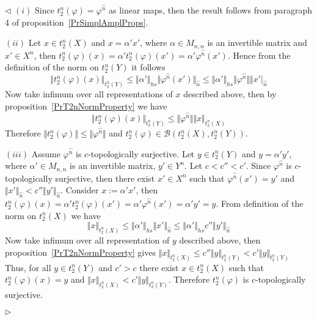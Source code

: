 \documentclass[12pt]{article}
\newenvironment{proof}{\par $\triangleleft$}{$\triangleright$}
\begin{document}
\begin{proof}
$(i)$ Since $t_2^n(\varphi)=\varphi^{\wideparen{n}}$ as linear maps, then the 
result follows from paragraph 4 of proposition~\ref{PrSimplAmplProps}. 

$(ii)$ Let $x\in t_2^n(X)$ and $x=\alpha'x'$, where $\alpha\in M_{n,n}$ is an 
invertible matrix and $x'\in X^{n}$, then 
$t_2^n(\varphi)(x)=\alpha't_2^n(\varphi)(x')
=\alpha'\varphi^{\wideparen{n}}(x')$. Hence from the definition of the norm 
on $t_2^n(Y)$ it follows
$$
\Vert t_2^n(\varphi)(x)\Vert_{t_2^n(Y)}
\leq\Vert\alpha'\Vert_{hs}\Vert\varphi^{\wideparen{n}}(x')\Vert_{\wideparen{n}}
\leq\Vert\alpha'\Vert_{hs}\Vert\varphi^{\wideparen{n}}\Vert\Vert
x'\vert_{\wideparen{n}}
$$
Now take infimum over all representations of $x$ described above, then by 
proposition~\ref{PrT2nNormProperty} we have
$$
\Vert
t_2^n(\varphi)(x)\Vert_{t_2^n(Y)}\leq\Vert\varphi^{\wideparen{n}}\Vert\Vert
x\Vert_{t_2^n(X)}
$$
Therefore $\Vert t_2^n(\varphi)\Vert\leq\Vert\varphi^{\wideparen{n}}\Vert$ and 
$t_2^n(\varphi)\in\mathcal{B}(t_2^n(X),t_2^n(Y))$.

$(iii)$ Assume $\varphi^{\wideparen{n}}$ is $c$-topologically surjective. 
Let $y\in t_2^n(Y)$ and $y=\alpha' y'$, where $\alpha'\in M_{n,n}$ is an 
invertible matrix, $y'\in Y^n$. Let $c<c''<c'$. Since $\varphi^{\wideparen{n}}$ 
is $c$-topologically surjective, then there exist $x'\in X^n$ such that 
$\varphi^{\wideparen{n}}(x')=y'$ and $\Vert x'\Vert_{\wideparen{n}}
< c''\Vert y'\Vert_{\wideparen{n}}$. Consider 
$x:=\alpha'x'$, then $t_2^n(\varphi)(x)=\alpha't_2^n(\varphi)(x')
=\alpha'\varphi^{\wideparen{n}}(x')=\alpha' y'=y$. From definition of the norm 
on $t_2^n(X)$ we have
$$
\Vert x\Vert_{t_2^n(X)} \leq\Vert\alpha'\Vert_{hs}\Vert x'\Vert_{\wideparen{n}}
\leq\Vert\alpha'\Vert_{hs} c''\Vert y'\Vert_{\wideparen{n}}
$$
Now take infimum over all representation of $y$ described above, then 
proposition~\ref{PrT2nNormProperty} gives 
$\Vert x\Vert_{t_2^n(X)}\leq c''\Vert y\Vert_{t_2^n(Y)}
<c'\Vert y\Vert_{t_2^n(Y)}$
Thus, for all $y\in t_2^n(Y)$ and $c'>c$ there exist $x\in t_2^n(X)$ such that 
$t_2^n(\varphi)(x)=y$ and $\Vert x\Vert_{t_2^n(X)}< c'\Vert y\Vert_{t_2^n(Y)}$. 
Therefore $t_2^n(\varphi)$ is 
$c$-topologically surjective.


\end{proof}
\end{document}
